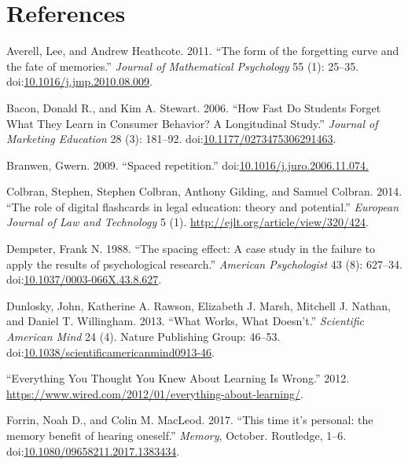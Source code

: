 \newpage

\section{References}\label{references}

\setlength{\parindent}{0pt} \setlength{\parskip}{6pt plus 2pt minus 1pt}

\hypertarget{refs}{}
\hypertarget{ref-Averell2011}{}
Averell, Lee, and Andrew Heathcote. 2011. ``The form of the forgetting
curve and the fate of memories.'' \emph{Journal of Mathematical
Psychology} 55 (1): 25--35.
doi:\href{https://doi.org/10.1016/j.jmp.2010.08.009}{10.1016/j.jmp.2010.08.009}.

\hypertarget{ref-Bacon2006}{}
Bacon, Donald R., and Kim A. Stewart. 2006. ``How Fast Do Students
Forget What They Learn in Consumer Behavior? A Longitudinal Study.''
\emph{Journal of Marketing Education} 28 (3): 181--92.
doi:\href{https://doi.org/10.1177/0273475306291463}{10.1177/0273475306291463}.

\hypertarget{ref-Gwern2009}{}
Branwen, Gwern. 2009. ``Spaced repetition.''
doi:\href{https://doi.org/10.1016/j.juro.2006.11.074.}{10.1016/j.juro.2006.11.074.}

\hypertarget{ref-Colbran2014}{}
Colbran, Stephen, Stephen Colbran, Anthony Gilding, and Samuel Colbran.
2014. ``The role of digital flashcards in legal education: theory and
potential.'' \emph{European Journal of Law and Technology} 5 (1).
\url{http://ejlt.org/article/view/320/424}.

\hypertarget{ref-Dempster1988}{}
Dempster, Frank N. 1988. ``The spacing effect: A case study in the
failure to apply the results of psychological research.'' \emph{American
Psychologist} 43 (8): 627--34.
doi:\href{https://doi.org/10.1037/0003-066X.43.8.627}{10.1037/0003-066X.43.8.627}.

\hypertarget{ref-Dunlosky2013}{}
Dunlosky, John, Katherine A. Rawson, Elizabeth J. Marsh, Mitchell J.
Nathan, and Daniel T. Willingham. 2013. ``What Works, What Doesn't.''
\emph{Scientific American Mind} 24 (4). Nature Publishing Group: 46--53.
doi:\href{https://doi.org/10.1038/scientificamericanmind0913-46}{10.1038/scientificamericanmind0913-46}.

\hypertarget{ref-Wired2012}{}
``Everything You Thought You Knew About Learning Is Wrong.'' 2012.
\url{https://www.wired.com/2012/01/everything-about-learning/}.

\hypertarget{ref-Forrin2017}{}
Forrin, Noah D., and Colin M. MacLeod. 2017. ``This time it's personal:
the memory benefit of hearing oneself.'' \emph{Memory}, October.
Routledge, 1--6.
doi:\href{https://doi.org/10.1080/09658211.2017.1383434}{10.1080/09658211.2017.1383434}.

